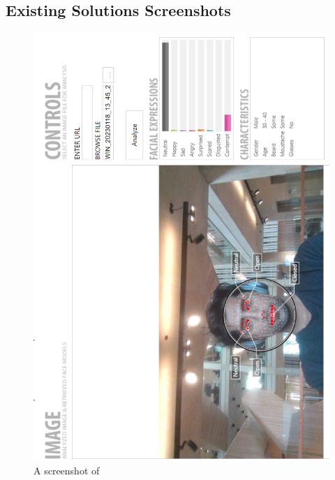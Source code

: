 \documentclass[12pt, a4paper]{article}
\begin{document}
\begin{appendices}
\pagestyle{fancy}


\section{Existing Solutions Screenshots}
\label{appendix:ess}

\begin{figure}[H]
    \centering
    \includegraphics[scale=0.76]{images/noldus.png}
    \caption{A screenshot of \cite{noldus}}
    \label{fig:essnoldus}
\end{figure}


\end{appendices}
\end{document}
